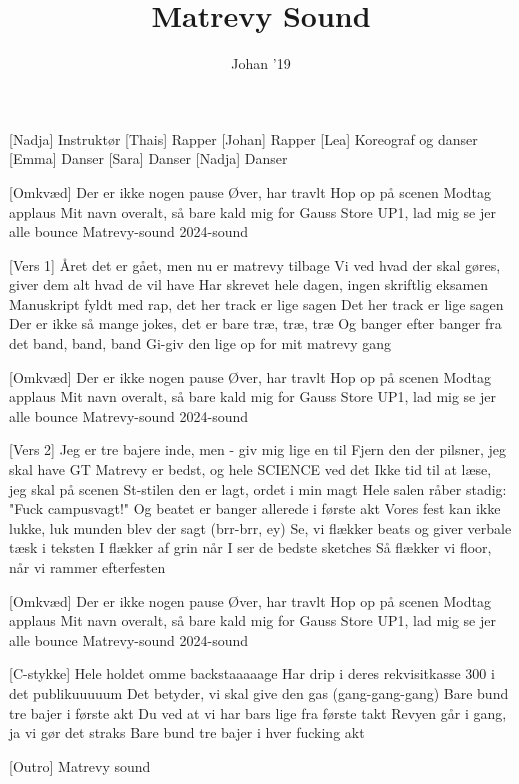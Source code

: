\documentclass[a4paper,11pt]{article}
\title{Matrevy Sound}
\author{Johan '19}
\begin{document}
\maketitle

\begin{roles}
[Nadja] Instruktør
[Thais] Rapper
[Johan] Rapper
[Lea] Koreograf og danser
[Emma] Danser
[Sara] Danser
[Nadja] Danser
\end{roles}

\begin{song}
[Omkvæd] Der er ikke nogen pause
Øver, har travlt
Hop op på scenen
Modtag applaus
Mit navn overalt, så bare kald mig for Gauss
Store UP1, lad mig se jer alle bounce
Matrevy-sound
2024-sound

  [Vers 1] Året det er gået, men nu er matrevy tilbage
Vi ved hvad der skal gøres, giver dem alt hvad de vil have
Har skrevet hele dagen, ingen skriftlig eksamen
Manuskript fyldt med rap, det her track er lige sagen
Det her track er lige sagen
Der er ikke så mange jokes, det er bare træ, træ, træ
Og banger efter banger fra det band, band, band
Gi-giv den lige op for mit matrevy gang

   [Omkvæd]  Der er ikke nogen pause
Øver, har travlt
Hop op på scenen
Modtag applaus
Mit navn overalt, så bare kald mig for Gauss
Store UP1, lad mig se jer alle bounce
Matrevy-sound
2024-sound

 [Vers 2] Jeg er tre bajere inde, men - giv mig lige en til
Fjern den der pilsner, jeg skal have GT
Matrevy er bedst, og hele SCIENCE ved det
Ikke tid til at læse, jeg skal på scenen
St-stilen den er lagt, ordet i min magt
Hele salen råber stadig: "Fuck campusvagt!"
Og beatet er banger allerede i første akt
Vores fest kan ikke lukke, luk munden blev der sagt
(brr-brr, ey)
Se, vi flækker beats og giver verbale tæsk i teksten
I flækker af grin når I ser de bedste sketches
Så flækker vi floor, når vi rammer efterfesten

[Omkvæd] Der er ikke nogen pause
Øver, har travlt
Hop op på scenen
Modtag applaus
Mit navn overalt, så bare kald mig for Gauss
Store UP1, lad mig se jer alle bounce
Matrevy-sound
2024-sound

  [C-stykke] Hele holdet omme backstaaaaage
Har drip i deres rekvisitkasse
300 i det publikuuuuum
Det betyder, vi skal give den gas (gang-gang-gang)
Bare bund tre bajer i første akt
Du ved at vi har bars lige fra første takt
Revyen går i gang, ja vi gør det straks
Bare bund tre bajer i hver fucking akt

 [Outro] Matrevy sound
\end{song}
\end{document}
